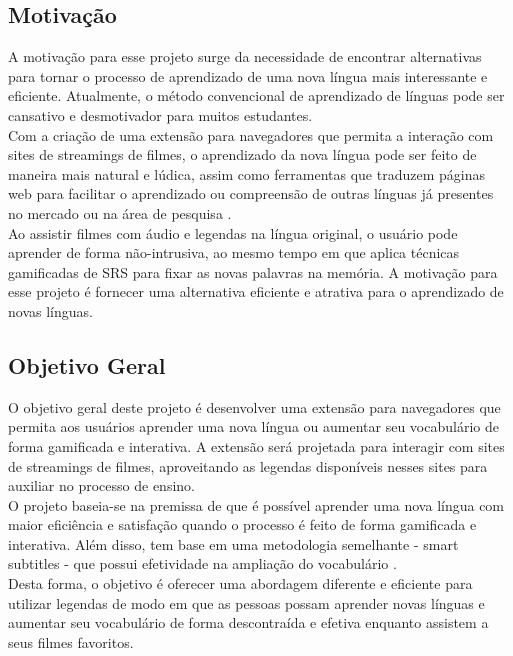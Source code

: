 \documentclass[12pt]{article}
\begin{document}
\subsection{Motivação}
A motivação para esse projeto surge da necessidade de encontrar alternativas para tornar o processo de aprendizado de uma nova língua mais interessante e eficiente. Atualmente, o método convencional de aprendizado de línguas pode ser cansativo e desmotivador para muitos estudantes. \\
Com a criação de uma extensão para navegadores que permita a interação com sites de streamings de filmes, o aprendizado da nova língua pode ser feito de maneira mais natural e lúdica, assim como ferramentas que traduzem páginas web para facilitar o aprendizado ou compreensão de outras línguas já presentes no mercado ou na área de pesquisa \cite{ElBatanony21}.\\
Ao assistir filmes com áudio e legendas na língua original, o usuário pode aprender de forma não-intrusiva, ao mesmo tempo em que aplica técnicas gamificadas de SRS para fixar as novas palavras na memória. A motivação para esse projeto é fornecer uma alternativa eficiente e atrativa para o aprendizado de novas línguas.

\subsection{Objetivo Geral}

O objetivo geral deste projeto é desenvolver uma extensão para navegadores que permita aos usuários aprender uma nova língua ou aumentar seu vocabulário de forma gamificada e interativa. A extensão será projetada para interagir com sites de streamings de filmes, aproveitando as legendas disponíveis nesses sites para auxiliar no processo de ensino. \\ 
O projeto baseia-se na premissa de que é possível aprender uma nova língua com maior eficiência e satisfação quando o processo é feito de forma gamificada e interativa. Além disso, tem base em uma metodologia semelhante - smart subtitles - que possui efetividade na ampliação do vocabulário \cite{Kovacs14}. \\ 
Desta forma, o objetivo é oferecer uma abordagem diferente e eficiente para utilizar legendas de modo em que as pessoas possam aprender novas línguas e aumentar seu vocabulário de forma descontraída e efetiva enquanto assistem a seus filmes favoritos.
\end{document}
